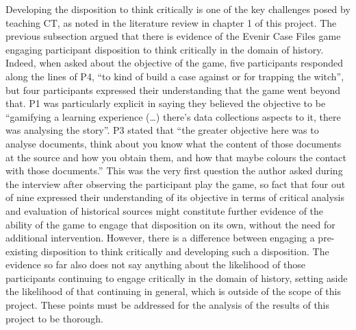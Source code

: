 \documentclass{l4proj}
\begin{document}
Developing the disposition to think critically is one of the key challenges posed by teaching CT, as noted in the literature review in chapter 1 of this project. The previous subsection argued that there is evidence of the Evenir Case Files game engaging participant disposition to think critically in the domain of history. Indeed, when asked about the objective of the game, five participants responded along the lines of P4, “to kind of build a case against or for trapping the witch”, but four participants expressed their understanding that the game went beyond that. P1 was particularly explicit in saying they believed the objective to be “gamifying a learning experience (…) there’s data collections aspects to it, there was analysing the story”. P3 stated that “the greater objective here was to analyse documents, think about you know what the content of those documents at the source and how you obtain them, and how that maybe colours the contact with those documents.” This was the very first question the author asked during the interview after observing the participant play the game, so fact that four out of nine expressed their understanding of its objective in terms of critical analysis and evaluation of historical sources might constitute further evidence of the ability of the game to engage that disposition on its own, without the need for additional intervention. However, there is a difference between engaging a pre-existing disposition to think critically and developing such a disposition. The evidence so far also does not say anything about the likelihood of those participants continuing to engage critically in the domain of history, setting aside the likelihood of that continuing in general, which is outside of the scope of this project. These points must be addressed for the analysis of the results of this project to be thorough.
\end{document}
